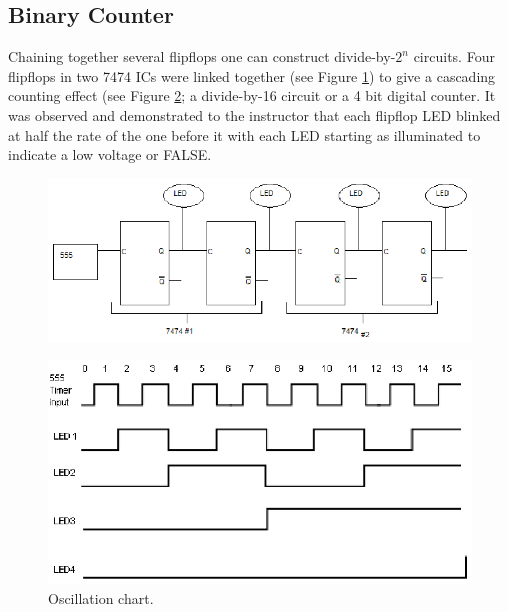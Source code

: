 \documentclass[11pt,onecolumn,letter]{article}
\begin{document}
\subsection{Binary Counter}\label{subsec:BinaryCounter}
Chaining together several flipflops one can construct divide-by-$2^n$ circuits. Four flipflops in two 7474 ICs were linked together (see Figure \ref{fig:BinaryCounter}) to give a cascading counting effect (see Figure \ref{fig:oscillationChart}; a divide-by-16 circuit or a 4 bit digital counter. It was observed and demonstrated to the instructor that each flipflop LED blinked at half the rate of the one before it with each LED starting as illuminated to indicate a low voltage or FALSE.
%
%
\begin{figure}
\center
\includegraphics{BinaryCounter.eps}
\caption{}\label{fig:BinaryCounter}
\end{figure}
%
%
\begin{figure}
\center
\includegraphics{oscillationChart.eps}
\caption{Oscillation chart.}\label{fig:oscillationChart}
\end{figure}

%
%
\end{document}
